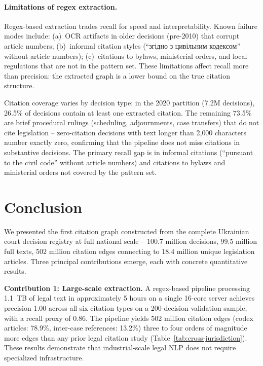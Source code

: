 \documentclass[11pt]{article}
\begin{document}
\paragraph{Limitations of regex extraction.}
Regex-based extraction trades recall for speed and interpretability.
Known failure modes include: (a)~OCR artifacts in older decisions (pre-2010) that corrupt article numbers; (b)~informal citation styles (``\foreignlanguage{ukrainian}{згідно з цивільним кодексом}'' without article numbers); (c)~citations to bylaws, ministerial orders, and local regulations that are not in the pattern set.
These limitations affect recall more than precision: the extracted graph is a lower bound on the true citation structure.

Citation coverage varies by decision type: in the 2020 partition (7.2M decisions), 26.5\% of decisions contain at least one extracted citation.
The remaining 73.5\% are brief procedural rulings (scheduling, adjournments, case transfers) that do not cite legislation -- zero-citation decisions with text longer than 2{,}000 characters number exactly zero, confirming that the pipeline does not miss citations in substantive decisions.
The primary recall gap is in informal citations (``pursuant to the civil code'' without article numbers) and citations to bylaws and ministerial orders not covered by the pattern set.


\section{Conclusion}
\label{sec:conclusion}

We presented the first citation graph constructed from the complete Ukrainian court decision registry at full national scale -- 100.7 million decisions, 99.5 million full texts, 502 million citation edges connecting to 18.4 million unique legislation articles.
Three principal contributions emerge, each with concrete quantitative results.

\textbf{Contribution 1: Large-scale extraction.}
A regex-based pipeline processing 1.1~TB of legal text in approximately 5 hours on a single 16-core server achieves precision 1.00 across all six citation types on a 200-decision validation sample, with a recall proxy of 0.86.
The pipeline yields 502 million citation edges (codex articles: 78.9\%, inter-case references: 13.2\%) three to four orders of magnitude more edges than any prior legal citation study (Table~\ref{tab:cross-jurisdiction}).
These results demonstrate that industrial-scale legal NLP does not require specialized infrastructure.
\end{document}
